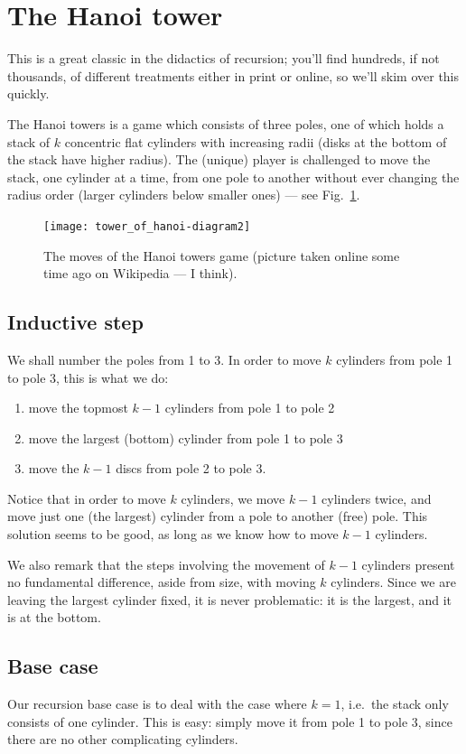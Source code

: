\documentclass[a4paper]{book}
\theoremstyle{changebreak}                %
\begin{document}
\section{The Hanoi tower}
This is a great classic in the didactics of recursion; you'll find
hundreds, if not thousands, of different treatments either in print or
online, so we'll skim over this quickly.

The Hanoi towers is a game which consists of three
poles, one of which holds a stack of $k$ concentric flat
cylinders with increasing radii
(disks at the bottom of the stack have higher radius). The (unique)
player is challenged to move the stack, one cylinder at a time, from
one pole to another without ever changing the radius order (larger
cylinders below smaller ones) --- see Fig.~\ref{f:hanoi}.
\begin{figure}[!ht]
\begin{center}
\texttt{[image: tower\_of\_hanoi-diagram2]}
\end{center}
\caption{The moves of the Hanoi towers game (picture taken online some
  time ago on Wikipedia --- I think).}
\label{f:hanoi}
\end{figure}

\subsection{Inductive step}
We shall number the poles from 1 to 3. In order to move $k$ cylinders
from pole 1 to pole 3, this is what we do:
\begin{enumerate}
\item move the topmost $k-1$ cylinders from pole 1 to pole 2
\item move the largest (bottom) cylinder from pole 1 to pole 3
\item move the $k-1$ discs from pole 2 to pole 3.
\end{enumerate}
Notice that in order to move $k$ cylinders, we move $k-1$ cylinders
twice, and move just one (the largest) cylinder from a pole to another
(free) pole. This solution seems to be good, as long as we know how to
move $k-1$ cylinders. 

We also remark that the steps involving the movement of $k-1$ cylinders
present no fundamental difference, aside from size, with moving $k$
cylinders. Since we are leaving the largest cylinder fixed, it is
never problematic: it is the largest, and it is at the bottom.

\subsection{Base case}
Our recursion base case is to deal with the case where $k=1$, i.e.~the
stack only consists of one cylinder. This is easy: simply move it from
pole 1 to pole 3, since there are no other complicating cylinders.
\end{document}

